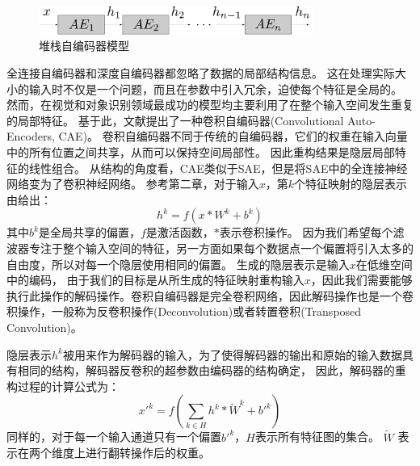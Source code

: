 \begin{figure}
	\centering
	\includegraphics[width=9cm]{figures/AE/sae}
	\caption{堆栈自编码器模型}
	\label{fig:sae}
\end{figure}

全连接自编码器和深度自编码器都忽略了数据的局部结构信息。
这在处理实际大小的输入时不仅是一个问题，而且在参数中引入冗余，迫使每个特征是全局的。
然而，在视觉和对象识别领域最成功的模型\cite{lowe1999object}均主要利用了在整个输入空间发生重复的局部特征。
基于此，文献\cite{masci2011stacked}提出了一种卷积自编码器(Convolutional Auto-Encoders, CAE)。
卷积自编码器不同于传统的自编码器，它们的权重在输入向量中的所有位置之间共享，从而可以保持空间局部性。
因此重构结果是隐层局部特征的线性组合。
从结构的角度看，CAE类似于SAE，但是将SAE中的全连接神经网络变为了卷积神经网络。
参考第二章，对于输入$x$，第$k$个特征映射的隐层表示由给出：
\begin{equation}
	h^k=f(x*W^k+b^k)
	\label{equ:cae1}
\end{equation}
其中$b^k$是全局共享的偏置，$f$是激活函数，$*$表示卷积操作。
因为我们希望每个滤波器专注于整个输入空间的特征，另一方面如果每个数据点一个偏置将引入太多的自由度，所以对每一个隐层使用相同的偏置。
生成的隐层表示是输入$x$在低维空间中的编码，
由于我们的目标是从所生成的特征映射重构输入$x$，因此我们需要能够执行此操作的解码操作。卷积自编码器是完全卷积网络，因此解码操作也是一个卷积操作，一般称为反卷积操作(Deconvolution)或者转置卷积(Transposed Convolution)。




隐层表示$h^k$被用来作为解码器的输入，为了使得解码器的输出和原始的输入数据具有相同的结构，解码器反卷积的超参数由编码器的结构确定，
因此，解码器的重构过程的计算公式为：
\begin{equation}
	x'^k=f(\sum_{k \in H}h^k * \tilde{W}^k + b'^k)
	\label{equ:cae2}
\end{equation}
同样的，对于每一个输入通道只有一个偏置$b'^k$，$H$表示所有特征图的集合。
$\tilde{W}$ 表示在两个维度上进行翻转操作后的权重。

